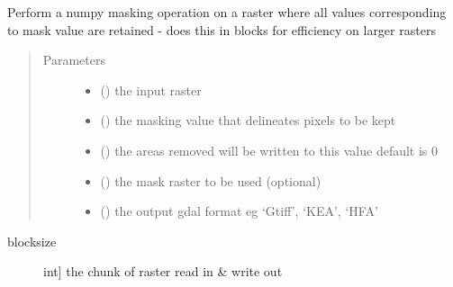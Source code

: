 \documentclass[letterpaper,10pt,english]{sphinxmanual}
\begin{document}

\begin{fulllineitems}
\label{\detokenize{pycmac:utilities.mask_raster_multi}}
Perform a numpy masking operation on a raster where all values
corresponding to  mask value are retained - does this in blocks for
efficiency on larger rasters
\begin{quote}\begin{description}
\item[{Parameters}] \leavevmode\begin{itemize}
\item {} 
 () \textendash{} the input raster

\item {} 
 () \textendash{} the masking value that delineates pixels to be kept

\item {} 
 () \textendash{} the areas removed will be written to this value default is 0

\item {} 
 () \textendash{} the mask raster to be used (optional)

\item {} 
 () \textendash{} the output gdal format eg ‘Gtiff’, ‘KEA’, ‘HFA’

\end{itemize}

\end{description}\end{quote}
\begin{description}
\item[{blocksize}] \leavevmode{[}int{]}
the chunk of raster read in \& write out

\end{description}

\end{fulllineitems}
\end{document}
